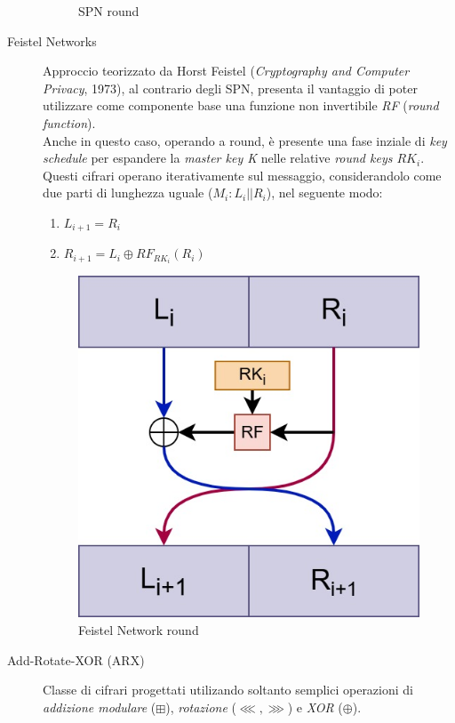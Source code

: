 \documentclass[target=bach,aauheader=,style=]{thud}
\begin{document}
\begin{description}
\begin{figure}[htbp]
                    \caption{SPN round}
                    \label{fig:placeholder}
                \end{figure}
                \item[Feistel Networks \cite{moderncrypto}] Approccio teorizzato da Horst Feistel (\textit{Cryptography and Computer Privacy}, 1973), al contrario degli SPN, presenta il vantaggio di poter utilizzare come componente base una funzione non invertibile \textit{RF} (\textit{round function}).\\
                Anche in questo caso, operando a round, è presente una fase inziale di \textit{key schedule} per espandere la \textit{master key K} nelle relative \textit{round keys $RK_i$}.\\
                Questi cifrari operano iterativamente sul messaggio, considerandolo come due parti di lunghezza uguale ($M_i:L_i||R_i$), nel seguente modo:
                \begin{enumerate}
                    \item $L_{i+1} = R_i$
                    \item $R_{i+1} = L_i \oplus RF_{RK_i}(R_i)$
                \end{enumerate}
                \begin{figure}[htbp]
                    \centering
                    \includegraphics[width=0.5\linewidth]{img/feistel_round.jpg}
                    \caption{Feistel Network round}
                    \label{fig:placeholder}
                \end{figure}
                \item[Add-Rotate-XOR (ARX)\cite{sparx}] Classe di cifrari progettati utilizando soltanto semplici operazioni di \textit{addizione modulare} ($\boxplus$), \textit{rotazione} ($\lll, \ggg$) e \textit{XOR} ($\oplus$).
            \end{description}
            
\end{document}
